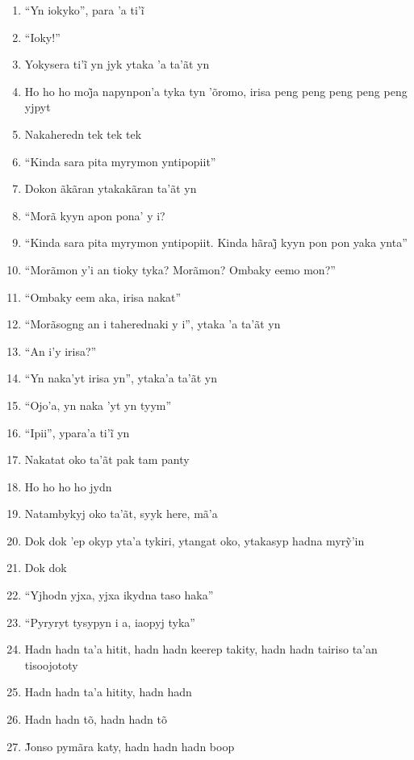 \begin{enumerate}
 \item ``Yn iokyko'', para ’a ti’ĩ
 \item ``Ioky!''
 \item Yokysera ti’ĩ yn jyk ytaka ’a ta’ãt yn
 \item Ho ho ho moj̃a napynpon’a tyka tyn ’õromo, irisa peng peng peng peng peng yjpyt
 \item Nakaheredn tek tek tek
 \begin{center}\end{center}
 \item ``Kinda sara pita myrymon yntipopiit''
 \item Dokon ãkãran ytakakãran ta'ãt yn
 \item ``Morã kyyn apon pona' y i?
 \item ``Kinda sara pita myrymon yntipopiit. Kinda hãraj̃ kyyn pon pon yaka ynta''
 \item ``Morãmon y'i an tioky tyka? Morãmon? Ombaky eemo mon?''
 \item ``Ombaky eem aka, irisa nakat''
 \item ``Morãsogng an i taherednaki y i'', ytaka 'a ta'ãt yn
 \item ``An i'y irisa?''
 \item ``Yn naka'yt irisa yn'', ytaka'a ta'ãt yn
 \item ``Ojo'a, yn naka 'yt yn tyym''
 \item ``Ipii'', ypara’a ti’ĩ yn
 \item Nakatat oko ta'ãt pak tam panty
 \begin{center}\end{center}
 \item Ho ho ho ho jydn
 \item Natambykyj oko ta'ãt, syyk here, mã'a
 \item Dok dok ’ep okyp yta’a tykiri, ytangat oko, ytakasyp hadna myrỹ’in
 \item Dok dok
 \item ``Yjhodn yjxa, yjxa ikydna taso haka''
 \item ``Pyryryt tysypyn i a, iaopyj tyka''
 \item Hadn hadn ta'a hitit, hadn hadn keerep takity, hadn hadn tairiso
 ta'an tisoojototy
 \item Hadn hadn ta'a hitity, hadn hadn
 \item Hadn hadn tõ, hadn hadn tõ
 \item J̃onso pymãra katy, hadn hadn hadn boop
 \begin{center}\end{center}

\end{enumerate}
